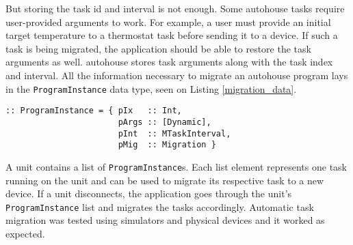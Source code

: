 But storing the task id and interval is not enough. Some \gls{autohouse} tasks require user-provided arguments to work. For example, a user must provide an initial target temperature to a thermostat task before sending it to a device. If such a task is being migrated, the application should be able to restore the task arguments as well. \gls{autohouse} stores task arguments along with the task index and interval. All the information necessary to migrate an \gls{autohouse} program lays in the \texttt{ProgramInstance} data type, seen on Listing \ref{migration_data}.

\begin{lstlisting}[caption=Task migration data,captionpos=b,label=migration_data]
:: ProgramInstance = { pIx   :: Int,
                       pArgs :: [Dynamic],
                       pInt  :: MTaskInterval,
                       pMig  :: Migration }
\end{lstlisting}

A unit contains a list of \texttt{ProgramInstance}s. Each list element represents one task running on the unit and can be used to migrate its respective task to a new device. If a unit disconnects, the application goes through the unit's \texttt{ProgramInstance} list and migrates the tasks accordingly. Automatic task migration was tested using simulators and physical devices and it worked as expected.